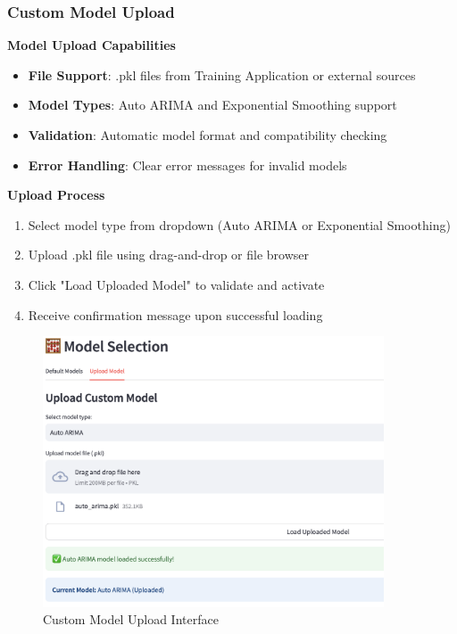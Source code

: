 \subsubsection{Custom Model Upload}

\textbf{Model Upload Capabilities}
\begin{itemize}
	\item \textbf{File Support}: .pkl files from Training Application or external sources
	\item \textbf{Model Types}: Auto ARIMA and Exponential Smoothing support
	\item \textbf{Validation}: Automatic model format and compatibility checking
	\item \textbf{Error Handling}: Clear error messages for invalid models
\end{itemize}

\textbf{Upload Process}
\begin{enumerate}
	\item Select model type from dropdown (Auto ARIMA or Exponential Smoothing)
	\item Upload .pkl file using drag-and-drop or file browser
	\item Click "Load Uploaded Model" to validate and activate
	\item Receive confirmation message upon successful loading
\end{enumerate}

\begin{figure}[H]
	\centering
	\includegraphics[width=0.9\textwidth]{Images/05ApplicationFunctionsAndFeatures/CustomModelUpload.png}
	\caption{Custom Model Upload Interface}
	\label{fig:custom_model_upload}
\end{figure}

